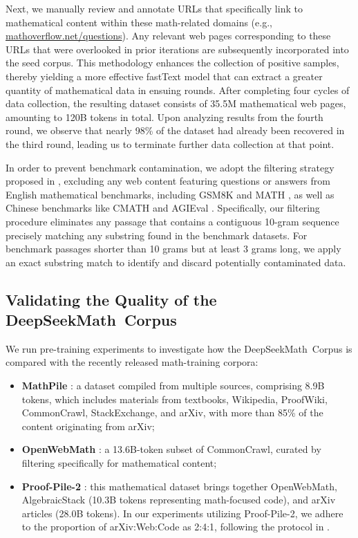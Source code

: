 \begin{itemize}[topsep=0pt]
Next, we manually review and annotate URLs that specifically link to mathematical content within these math-related domains (e.g., \url{mathoverflow.net/questions}). Any relevant web pages corresponding to these URLs that were overlooked in prior iterations are subsequently incorporated into the seed corpus. This methodology enhances the collection of positive samples, thereby yielding a more effective fastText model that can extract a greater quantity of mathematical data in ensuing rounds. After completing four cycles of data collection, the resulting dataset consists of 35.5M mathematical web pages, amounting to 120B tokens in total. Upon analyzing results from the fourth round, we observe that nearly 98\% of the dataset had already been recovered in the third round, leading us to terminate further data collection at that point.

In order to prevent benchmark contamination, we adopt the filtering strategy proposed in \cite{deepseek-coder}, excluding any web content featuring questions or answers from English mathematical benchmarks, including GSM8K \citep{gsm8k} and MATH \citep{MATH}, as well as Chinese benchmarks like CMATH \citep{wei2023cmath} and AGIEval \citep{agieval}. Specifically, our filtering procedure eliminates any passage that contains a contiguous 10-gram sequence precisely matching any substring found in the benchmark datasets. For benchmark passages shorter than 10 grams but at least 3 grams long, we apply an exact substring match to identify and discard potentially contaminated data.

\subsection{Validating the Quality of the DeepSeekMath~Corpus}

We run pre-training experiments to investigate how the DeepSeekMath~Corpus is compared with the recently released math-training corpora:

\begin{itemize}[topsep=0pt]
    \item \textbf{MathPile} \citep{mathpile}: a dataset compiled from multiple sources, comprising 8.9B tokens, which includes materials from textbooks, Wikipedia, ProofWiki, CommonCrawl, StackExchange, and arXiv, with more than 85\% of the content originating from arXiv;
    \item \textbf{OpenWebMath} \citep{openwebmath}: a 13.6B-token subset of CommonCrawl, curated by filtering specifically for mathematical content;
    \item \textbf{Proof-Pile-2} \citep{llemma}: this mathematical dataset brings together OpenWebMath, AlgebraicStack (10.3B tokens representing math-focused code), and arXiv articles (28.0B tokens). In our experiments utilizing Proof-Pile-2, we adhere to the proportion of arXiv:Web:Code as 2:4:1, following the protocol in \cite{llemma}.
\end{itemize}


\end{itemize}

